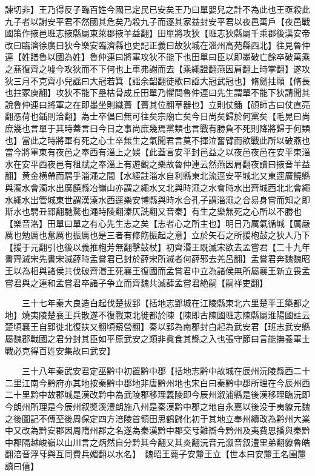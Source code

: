 諫切非】王乃得反子臨百姓今國已定民已安矣王乃曰單嬰兒之計不為此也王亟殺此九子者以謝安平君不然國其危矣乃殺九子而逐其家益封安平君以夜邑萬戶【夜邑戰國策作掖邑班志掖縣屬東萊郡掖羊益翻】田單將攻狄【班志狄縣屬千乘郡後漢安帝改曰臨濟徐廣曰狄今樂安臨濟縣也史記正義曰故狄城在淄州高苑縣西北】往見魯仲連【姓譜魯以國為姓】魯仲連曰將軍攻狄不能下也田單曰臣以即墨破亡餘卒破萬乘之燕復齊之墟今攻狄而不下何也上車弗謝而去【乘繩證翻燕因肩翻上時掌翻】遂攻狄三月不克齊小兒謡曰大冠若箕【謡余韶翻徒歌曰謡大冠武冠也】脩劒拄頤【脩長也拄冢庾翻】攻狄不能下壘枯骨成丘田單乃懼問魯仲連曰先生謂單不能下狄請聞其說魯仲連曰將軍之在即墨坐則織蕢【蕢其位翻草器也】立則仗鍤【顔師古曰仗直亮翻憑荷也鍤則洽翻】為士卒倡曰無可往矣宗廟亡矣今日尚矣歸於何黨矣【毛晃曰尚庶幾也言單于其時蓋言曰今日之事尚庶幾焉黨類也言戰有勝負不死則降將歸于何類也】當此之時將軍有死之心士卒無生之氣聞君言莫不揮泣奮臂而欲戰此所以破燕也當今將軍東有夜邑之奉西有淄上之娛【此蓋言安平封邑益之以夜邑夜邑在安平東淄水在安平西夜邑有租賦之奉淄上有遊觀之樂故魯仲連云然燕因肩翻夜讀曰掖音羊益翻】黄金横帶而騁乎淄澠之間【水經註淄水自利縣東北流逕安平城北又東逕廣饒縣與濁水會濁水出廣饒縣冶嶺山亦謂之繩水又北與時澠之水會時水出齊城西北北會繩水繩水出管城東世謂漢溱水西逕樂安博縣與時水合孔子謂淄澠之合易身嘗而知之即斯水也騁丑郢翻馳騖也澠時陵翻溱仄詵翻又音秦】有生之樂無死之心所以不勝也【樂音洛】田單曰單之有心先生志之矣【志者心之所主也】明日乃厲氣循城【厲嚴厲也勉厲也奮厲也振厲也是三者有修飭振起之意】立於矢石之所援枹鼔之狄人乃下【援于元翻引也後以義推枹芳無翻擊鼔杖】初齊湣王既滅宋欲去孟嘗君【二十九年書齊滅宋先書宋滅薛時孟嘗君已封於薛宋所滅者何薛邪去羌呂翻】孟嘗君奔魏魏昭王以為相與諸侯共伐破齊湣王死襄王復國而孟嘗君中立為諸侯無所屬襄王新立畏孟嘗君與之連和孟嘗君卒諸子争立而齊魏共滅薛孟嘗君絶嗣【嗣祥吏翻】

　　三十七年秦大良造白起伐楚拔郢【括地志郢城在江陵縣東北六里楚平王築都之地】燒夷陵楚襄王兵散遂不復戰東北徙都於陳【陳即古陳國班志陳縣屬淮陽國註云楚頃襄王自郢徙北復扶又翻頃窺營翻】秦以郢為南郡封白起為武安君【班志武安縣屬魏郡戰國之君分封其臣如平原武安之類非眞食其縣之入也張守節曰言能撫養軍士戰必克得百姓安集故曰武安】

　　三十八年秦武安君定巫黔中初置黔中郡【括地志黔中故城在辰州沅陵縣西二十二里江南今黔府亦其地按秦黔中郡地非唐黔州地也宋白曰秦黔中郡所理在今辰州西二十里黔中故郡城是漢改黔中為武陵郡移理義陵即今辰州溆浦縣是後漢移理臨沅即今朗州所理是今辰州叙奬溪澧朗施八州是秦漢黔中郡之地自永嘉以後没于夷䝤元魏之後圖記不傳至後周保定四方涪陵首領田思鶴歸化初于其地立奉州續改為黔州大業中又改為黔安郡因周隋州郡之名遂為秦漢黔中郡交㸦難辯今黔州及夷費思播與秦黔中郡隔越峻嶺以山川言之炳然自分黔其今翻又其炎翻沅音元溆音叙澧里弟翻䝤魯皓翻涪音浮㸦與互同費兵媚翻以水名】　魏昭王薨子安釐王立【世本曰安釐王名圉釐讀曰僖】

